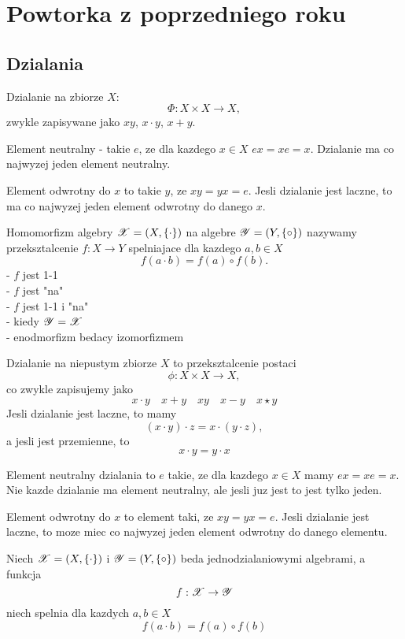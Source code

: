 \section{Powtorka z poprzedniego roku}

\subsection{Dzialania}
\begin{multicols*}{2}

    Dzialanie na zbiorze $X$:
    $$\Phi: X\times X\to X,$$
    zwykle zapisywane jako $xy$, $x\cdot y$, $x+y$.\smallskip

    {\color{def}Element neutralny} - takie $e$, ze dla kazdego $x\in X$ $ex=xe=x$. Dzialanie ma co najwyzej jeden element neutralny.\smallskip
    
    {\color{def}Element odwrotny} do $x$ to takie $y$, ze $xy=yx=e$. Jesli dzialanie jest laczne, to ma co najwyzej jeden element odwrotny do danego $x$.\medskip

    \medskip

    {\color{def}Homomorfizm} algebry $\mathcal{X}=(X,\{ \cdot\})$ na algebre $\mathcal{Y}=(Y,\{\circ\})$ nazywamy przeksztalcenie $f:X\to Y$ spelniajace dla kazdego $a, b\in X$
    $$f(a\cdot b)=f(a)\circ f(b).$$
     - $f$ jest 1-1\smallskip\\
     - $f$ jest "na"\smallskip\\
     - $f$ jest 1-1 i "na"\smallskip\\
     - kiedy $\mathcal{Y}=\mathcal{X}$\smallskip\\
     - enodmorfizm bedacy izomorfizmem

\end{multicols*}
Dzialanie na niepustym zbiorze $X$ to przeksztalcenie postaci
$$\phi:X\times X\to X,$$
co zwykle zapisujemy jako
$$x\cdot y\quad x+y\quad xy\quad x-y\quad x\star y$$
Jesli dzialanie jest laczne, to mamy
$$(x\cdot y)\cdot z = x\cdot(y\cdot z),$$
a jesli jest przemienne, to 
$$x\cdot y=y\cdot x$$

Element neutralny dzialania to $e$ takie, ze dla kazdego $x\in X$ mamy $ex=xe=x$. Nie kazde dzialanie ma element neutralny, ale jesli juz jest to jest tylko jeden.\bigskip

Element odwrotny do $x$ to element taki, ze $xy=yx=e$. Jesli dzialanie jest laczne, to moze miec co najwyzej jeden element odwrotny do danego elementu.

Niech $\mathcal{X}=(X, \{\cdot\})$ i $\mathcal{Y} = (Y, \{\circ\})$ beda jednodzialaniowymi algebrami, a funkcja 
$$f:\mathcal{X}\to \mathcal{Y}$$
niech spelnia dla kazdych $a, b\in X$
$$f(a\cdot b) = f(a)\circ f(b)$$
